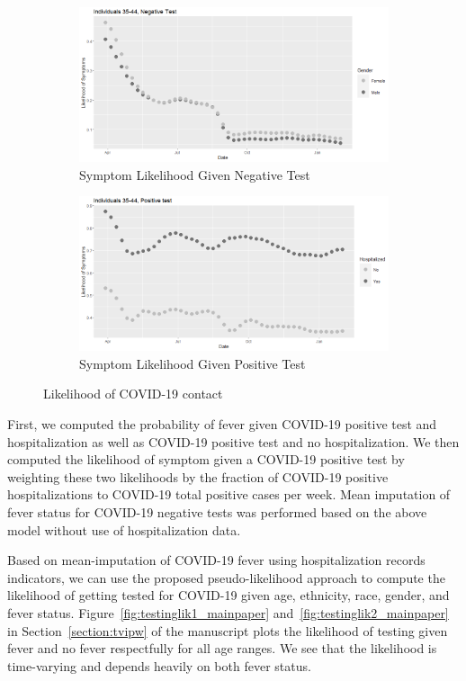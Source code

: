 \documentclass[11pt]{amsart}
\numberwithin{equation}{section}
\theoremstyle{plain}
\begin{document}
\begin{figure}[!th]
\centering
\begin{subfigure}{.5\textwidth}
 \centering
 \includegraphics[width=.9\linewidth]{../figs/tvprop_symptom_alt_fig1.png}
 \caption{Symptom Likelihood Given Negative Test}
 \label{fig:symptomlik1_model2}
\end{subfigure}%
\begin{subfigure}{.5\textwidth}
 \centering
\includegraphics[width=.9\linewidth]{../figs/tvprop_symptom_alt_fig2.png}
 \caption{Symptom Likelihood Given Positive Test}
 \label{fig:symptomlik2_model2}
\end{subfigure}
\caption{Likelihood of COVID-19 contact}
\label{fig:symptomlik_model2}
\end{figure}

First, we computed the probability of fever given COVID-19 positive test and hospitalization as well as COVID-19 positive test and no hospitalization.  We then computed the likelihood of symptom given a COVID-19 positive test by weighting these two likelihoods by the fraction of COVID-19 positive hospitalizations to COVID-19 total positive cases per week.  Mean imputation of fever status for COVID-19 negative tests was performed based on the above model without use of hospitalization data.

Based on mean-imputation of COVID-19 fever using hospitalization records indicators, we can use the proposed pseudo-likelihood approach to compute the likelihood of getting tested for COVID-19 given age, ethnicity, race, gender, and fever status.  Figure~\ref{fig:testinglik1_mainpaper} and~\ref{fig:testinglik2_mainpaper} in Section~\ref{section:tvipw} of the manuscript plots the likelihood of testing given fever and no fever respectfully for all age ranges.  We see that the likelihood is time-varying and depends heavily on both fever status.
\end{document}
